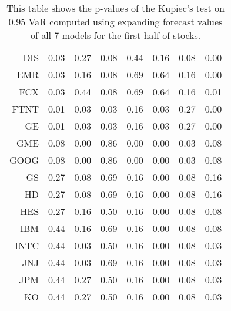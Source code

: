 \begin{table}[ht]
\begin{tabular}{rrrrrrrr}
  DIS & 0.03 & 0.27 & 0.08 & 0.44 & 0.16 & 0.08 & 0.00 \\ 
  EMR & 0.03 & 0.16 & 0.08 & 0.69 & 0.64 & 0.16 & 0.00 \\ 
  FCX & 0.03 & 0.44 & 0.08 & 0.69 & 0.64 & 0.16 & 0.01 \\ 
  FTNT & 0.01 & 0.03 & 0.03 & 0.16 & 0.03 & 0.27 & 0.00 \\ 
  GE & 0.01 & 0.03 & 0.03 & 0.16 & 0.03 & 0.27 & 0.00 \\ 
  GME & 0.08 & 0.00 & 0.86 & 0.00 & 0.00 & 0.03 & 0.08 \\ 
  GOOG & 0.08 & 0.00 & 0.86 & 0.00 & 0.00 & 0.03 & 0.08 \\ 
  GS & 0.27 & 0.08 & 0.69 & 0.16 & 0.00 & 0.08 & 0.16 \\ 
  HD & 0.27 & 0.08 & 0.69 & 0.16 & 0.00 & 0.08 & 0.16 \\ 
  HES & 0.27 & 0.16 & 0.50 & 0.16 & 0.00 & 0.08 & 0.08 \\ 
  IBM & 0.44 & 0.16 & 0.69 & 0.16 & 0.00 & 0.08 & 0.08 \\ 
  INTC & 0.44 & 0.03 & 0.50 & 0.16 & 0.00 & 0.08 & 0.03 \\ 
  JNJ & 0.44 & 0.03 & 0.69 & 0.16 & 0.00 & 0.08 & 0.03 \\ 
  JPM & 0.44 & 0.27 & 0.50 & 0.16 & 0.00 & 0.08 & 0.03 \\ 
  KO & 0.44 & 0.27 & 0.50 & 0.16 & 0.00 & 0.08 & 0.03 \\ 
   \hline
\end{tabular}
\caption[Kupiec's test p-values, alpha =0.95 (1)]{This table shows the p-values of the Kupiec's test on 0.95 VaR computed using expanding forecast values of all 7 models for the first half of stocks.} 
\label{Table:Kupiec_test_expanding_0.95_1}
\end{table}
